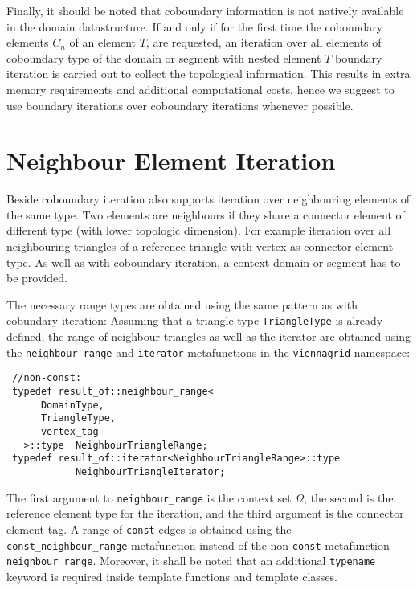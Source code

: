 Finally, it should be noted that coboundary information is not natively available in the domain datastructure. If and only if for the first time
the coboundary elements $C_n$ of an element $T$, are requested, an iteration over all elements of coboundary type of the domain or segment with nested element $T$ boundary iteration is carried out to collect the topological information.
This results in extra memory requirements and additional computational costs, hence we suggest to use boundary iterations over coboundary iterations whenever possible.



\section{Neighbour Element Iteration}
Beside coboundary iteration {\ViennaGridversion} also supports iteration over neighbouring elements of the same type. Two elements are neighbours if they share a connector element of different type (with lower topologic dimension). For example iteration over all neighbouring triangles of a reference triangle with vertex as connector element type. As well as with coboundary iteration, a context domain or segment has to be provided.


The necessary range types are obtained using the same pattern as with cobundary iteration:
Assuming that a triangle type \lstinline|TriangleType| is already defined, the range of neighbour triangles as well as the iterator are obtained
using the \lstinline|neighbour_range| and \lstinline|iterator| metafunctions in the \lstinline|viennagrid| namespace:
\begin{lstlisting}
 //non-const:
 typedef result_of::neighbour_range<
      DomainType,
      TriangleType,
      vertex_tag
   >::type  NeighbourTriangleRange;
 typedef result_of::iterator<NeighbourTriangleRange>::type
            NeighbourTriangleIterator;
\end{lstlisting}
The first argument to \lstinline|neighbour_range| is the context set $\Omega$, the second is the reference element type for the iteration, and the third argument is the connector element tag.
A range of \lstinline|const|-edges is obtained using the \lstinline|const_neighbour_range| metafunction instead of the non-\lstinline|const| metafunction \lstinline|neighbour_range|.
Moreover, it shall be noted that an additional \lstinline|typename| keyword is required inside template functions and template classes.

